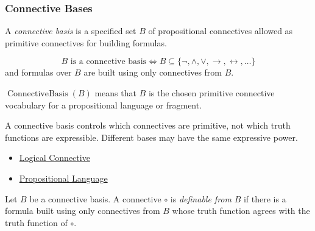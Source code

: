 \subsubsection*{Connective Bases}

\begin{tcolorbox}[colback=propbox, colframe=propborder, arc=2pt,
  left=6pt, right=6pt, top=4pt, bottom=4pt,
  title={\small\textbf{Definition (Connective Basis)}},
  fonttitle=\small\bfseries]
\begin{definition}
\label{def:connective-basis-propositional-logic}
A \emph{connective basis} is a specified set \(B\) of propositional connectives
allowed as primitive connectives for building formulas.
\end{definition}
\end{tcolorbox}

\begin{remark*}
\[
B\text{ is a connective basis}
\Longleftrightarrow
B\subseteq\{\neg,\land,\lor,\to,\leftrightarrow,\ldots\}
\]
and formulas over \(B\) are built using only connectives from \(B\).
\end{remark*}

\begin{remark*}
\(\operatorname{ConnectiveBasis}(B)\) means that \(B\) is the chosen primitive
connective vocabulary for a propositional language or fragment.
\end{remark*}

\begin{remark*}[Interpretation]
A connective basis controls which connectives are primitive, not which truth
functions are expressible. Different bases may have the same expressive power.
\end{remark*}

\begin{dependencies}
\begin{itemize}
  \item \hyperref[def:logical-connective]{Logical Connective}
  \item \hyperref[def:propositional-language]{Propositional Language}
\end{itemize}
\end{dependencies}

\begin{tcolorbox}[colback=propbox, colframe=propborder, arc=2pt,
  left=6pt, right=6pt, top=4pt, bottom=4pt,
  title={\small\textbf{Definition (Definable Connective)}},
  fonttitle=\small\bfseries]
\begin{definition}
\label{def:definable-connective-propositional-logic}
Let \(B\) be a connective basis. A connective \(\circ\) is \emph{definable from}
\(B\) if there is a formula built using only connectives from \(B\) whose truth
function agrees with the truth function of \(\circ\).
\end{definition}
\end{tcolorbox}

